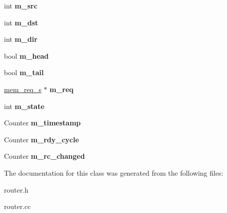 \begin{DoxyCompactItemize}
\item 
\hypertarget{classflit__c_aba3df5fcabe1b315eb2c474cad5fe3ea}{
int {\bfseries m\_\-src}}
\label{classflit__c_aba3df5fcabe1b315eb2c474cad5fe3ea}

\item 
\hypertarget{classflit__c_a419ff917b67c165075cf981ea7896fcc}{
int {\bfseries m\_\-dst}}
\label{classflit__c_a419ff917b67c165075cf981ea7896fcc}

\item 
\hypertarget{classflit__c_a7a3332c5eb4c35d89249919e6c16cb33}{
int {\bfseries m\_\-dir}}
\label{classflit__c_a7a3332c5eb4c35d89249919e6c16cb33}

\item 
\hypertarget{classflit__c_a3c2290c48672ad47e52b76684ae364f3}{
bool {\bfseries m\_\-head}}
\label{classflit__c_a3c2290c48672ad47e52b76684ae364f3}

\item 
\hypertarget{classflit__c_a1ac6e065305a8c822c08dbcd17fb7f9a}{
bool {\bfseries m\_\-tail}}
\label{classflit__c_a1ac6e065305a8c822c08dbcd17fb7f9a}

\item 
\hypertarget{classflit__c_af937415005d684eb0fc177928541b58a}{
\hyperlink{structmem__req__s}{mem\_\-req\_\-s} $\ast$ {\bfseries m\_\-req}}
\label{classflit__c_af937415005d684eb0fc177928541b58a}

\item 
\hypertarget{classflit__c_a0398a6a614ffe3f503706391af70e37a}{
int {\bfseries m\_\-state}}
\label{classflit__c_a0398a6a614ffe3f503706391af70e37a}

\item 
\hypertarget{classflit__c_aa577bb9dfeebdbc5bf21ae20022acab3}{
Counter {\bfseries m\_\-timestamp}}
\label{classflit__c_aa577bb9dfeebdbc5bf21ae20022acab3}

\item 
\hypertarget{classflit__c_a296c930c42b2f2638a2d96c436fed563}{
Counter {\bfseries m\_\-rdy\_\-cycle}}
\label{classflit__c_a296c930c42b2f2638a2d96c436fed563}

\item 
\hypertarget{classflit__c_ad691f7fc05cf29195b570c830a581f56}{
Counter {\bfseries m\_\-rc\_\-changed}}
\label{classflit__c_ad691f7fc05cf29195b570c830a581f56}

\end{DoxyCompactItemize}


The documentation for this class was generated from the following files:\begin{DoxyCompactItemize}
\item 
router.h\item 
router.cc\end{DoxyCompactItemize}
